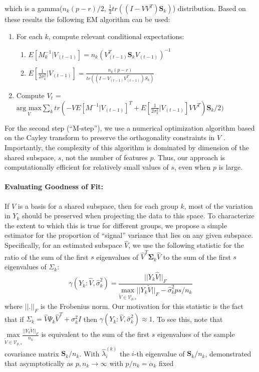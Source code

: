 \documentclass[12pt]{article}
\newcommand{\bl}[1]{{\mathbf #1}}
\begin{document}
\noindent which is a gamma($n_k(p-r)/2$,
$\frac{1}{2}tr((I-VV^T)\mathbf{S}_k)$) distribution.  Based on these
results the following EM algorithm can be used:

\begin{enumerate}
\item For each $k$, compute relevant conditional expectations:
\begin{enumerate}
\item $E[M_k^{-1} | V_{(t-1)}] = n_k(V_{(t-1)}^T \mathbf{S}_kV_{(t-1)})^{-1}$
\item $E[\frac{1}{2\sigma_k^2}|V_{(t-1)}] = \frac{n_k(p-r)}{tr((I-V_{(t-1)}V_{(t-1)}^T)S_k)}$
\end{enumerate}
\item Compute $V_{t}$ = $\underset{V}{\text{arg } \text{max}}  \sum_k tr\left(-VE[M^{-1}|V_{(t-1)}]^T +
       E[\frac{1}{2\sigma_k^2}|V_{(t-1)}]VV^T\right)\mathbf{S}_k/2)$ 
\end{enumerate}

For the second step (``M-step''), we use a numerical optimization algorithm based on
the Cayley transform to preserve the orthogonality constraints in $V$
\citep{Wen2013}.  Importantly, the complexity of this algorithm is
dominated by dimension of the shared subspace, $s$, not the number of
features $p$.  Thus, our approach is computationally efficient for
relatively small values of $s$, even when $p$ is large.

\paragraph{Evaluating Goodness of Fit:}

If $V$ is a basis for a shared subspace, then for each group $k$, most
of the variation in $Y_k$ should be preserved when projecting the data
to this space.  To characterize the extent to which this is true for
different groups, we propose a simple estimator for the proportion of
``signal'' variance that lies on any given subspace.  Specifically,
for an estimated subspace $\hat{V}$, we use the following statistic
for the ratio of the sum of the first $s$ eigenvalues of
$\hat{V}^T\bl \Sigma_k \hat{V}$ to the sum of the first $s$
eigenvalues of $\Sigma_k$:
%
\begin{equation}
\gamma(Y_k: \hat{V}, \hat{\sigma}_k^2) = \frac{||Y_k\hat{V}||_F}{\underset{\widetilde{V} \in \mathcal{V}_{p, s}}{\text{max}}
  ||Y_k\widetilde{V}||_F - \hat{\sigma}_k^2ps/n_k}
\label{eqn:ratio}
\end{equation}
%
\noindent where $||.||_F$ is the Frobenius norm. Our motivation for
this statistic is the fact that if
$\Sigma_k = \hat{V}\Psi_k\hat{V}^T + \sigma_k^2I$ then
$\gamma(Y_k: \hat{V}, \hat{\sigma}_k^2) \approx 1$.  To see this, note
that $\underset{\widetilde{V} \in \mathcal{V}_{p, s}}{\text{max}}\frac{||Y_k\widetilde{V}||_F}{n_k}$
is equivalent to the sum of the first $s$ eigenvalues of the sample
covariance matrix $\bl S_k/n_k$.  With $\hat{\lambda}^{(k)}_i$
the $i$-th eigenvalue of $\bl S_k/n_k$, \citet{Baik2006}
demonstrated that asymptotically as $p, n_k \rightarrow \infty$ with
$p/n_k = \alpha_k$ fixed
\end{document}
